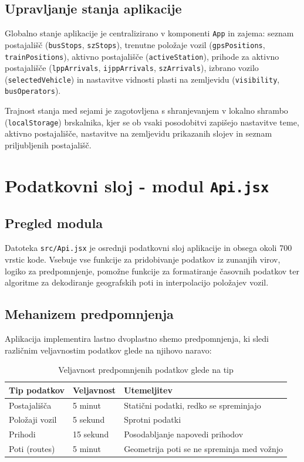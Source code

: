 \documentclass[12pt]{article}
\begin{document}
\subsection{Upravljanje stanja aplikacije}

Globalno stanje aplikacije je centralizirano v komponenti \texttt{App} in zajema: seznam postajališč (\texttt{busStops}, \texttt{szStops}), trenutne položaje vozil (\texttt{gpsPositions}, \texttt{trainPositions}), aktivno postajališče (\texttt{activeStation}), prihode za aktivno postajališče (\texttt{lppArrivals}, \texttt{ijppArrivals}, \texttt{szArrivals}), izbrano vozilo (\texttt{selectedVehicle}) in nastavitve vidnosti plasti na zemljevidu (\texttt{visibility}, \texttt{busOperators}).

Trajnost stanja med sejami je zagotovljena s shranjevanjem v lokalno shrambo (\texttt{localStorage}) brskalnika, kjer se ob vsaki posodobitvi zapišejo nastavitve teme, aktivno postajališče, nastavitve na zemljevidu prikazanih slojev in seznam priljubljenih postajališč.

\section{Podatkovni sloj - modul \texttt{Api.jsx}}

\subsection{Pregled modula}

Datoteka \texttt{src/Api.jsx} je osrednji podatkovni sloj aplikacije in obsega okoli 700 vrstic kode. Vsebuje vse funkcije za pridobivanje podatkov iz zunanjih virov, logiko za predpomnjenje, pomožne funkcije za formatiranje časovnih podatkov ter algoritme za dekodiranje geografskih poti in interpolacijo položajev vozil.

\subsection{Mehanizem predpomnjenja}

Aplikacija implementira lastno dvoplastno shemo predpomnjenja, ki sledi različnim veljavnostim podatkov glede na njihovo naravo:

\begin{table}[H]
\centering
\caption{Veljavnost predpomnjenih podatkov glede na tip}
\begin{tabular}{lll}
\toprule
\textbf{Tip podatkov} & \textbf{Veljavnost} & \textbf{Utemeljitev} \\
\midrule
Postajališča & 5 minut & Statični podatki, redko se spreminjajo \\
Položaji vozil & 5 sekund & Sprotni podatki \\
Prihodi & 15 sekund & Posodabljanje napovedi prihodov \\
Poti (routes) & 5 minut & Geometrija poti se ne spreminja med vožnjo \\
\bottomrule
\end{tabular}
\label{tab:cache}
\end{table}
\end{document}
